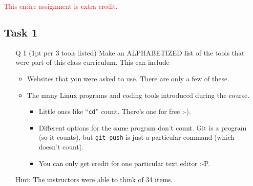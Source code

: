 
\begin{center}
\textcolor{red}{This entire assignment is extra credit.}
\end{center}

\subsection*{Task 1}

\begin{itemize}
    \item[Q 1] (1pt  per 3 tools listed) Make an ALPHABETIZED list of the tools that were part of this class curriculum.
    This can include
    \begin{itemize}
        \item Websites that you were asked to use. There are only a few of these.
        \item The many Linux programs and coding tools introduced during the course. 
        \begin{itemize}
            \item Little ones like ``\texttt{cd}'' count. There's one for free :-).
            \item Different options for the same program don't count. Git is a program (so it counts), but \texttt{git push} is just a particular command (which doesn't count).
            \item You can only get credit for one particular text editor :-P.
        \end{itemize}
    \end{itemize}
    \item[] Hint: The instructors were able to think of 34 items.
\end{itemize}


